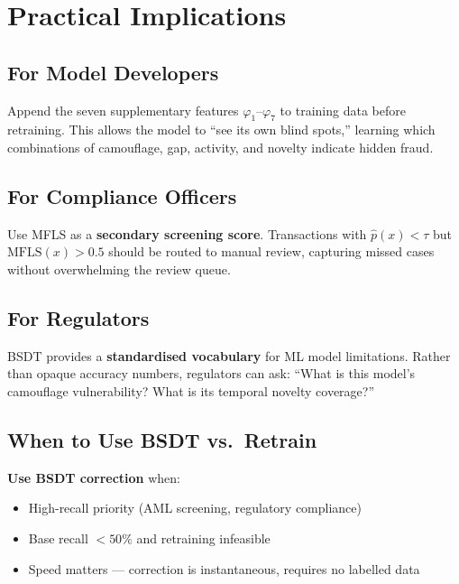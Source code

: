 \documentclass[journal]{IEEEtran}
\newcommand{\MFLS}{\mathrm{MFLS}}
\begin{document}
\section{Practical Implications}
\label{sec:implications}

\subsection{For Model Developers}

Append the seven supplementary features $\varphi_1$--$\varphi_7$ to training data before retraining. This allows the model to ``see its own blind spots,'' learning which combinations of camouflage, gap, activity, and novelty indicate hidden fraud.

\subsection{For Compliance Officers}

Use MFLS as a \textbf{secondary screening score}. Transactions with $\hat{p}(x) < \tau$ but $\MFLS(x) > 0.5$ should be routed to manual review, capturing missed cases without overwhelming the review queue.

\subsection{For Regulators}

BSDT provides a \textbf{standardised vocabulary} for ML model limitations. Rather than opaque accuracy numbers, regulators can ask: ``What is this model's camouflage vulnerability? What is its temporal novelty coverage?''

\subsection{When to Use BSDT vs.\ Retrain}

\textbf{Use BSDT correction} when:
\begin{itemize}
  \item High-recall priority (AML screening, regulatory compliance)
  \item Base recall $<50\%$ and retraining infeasible
  \item Speed matters --- correction is instantaneous, requires no labelled data
\end{itemize}
\end{document}
